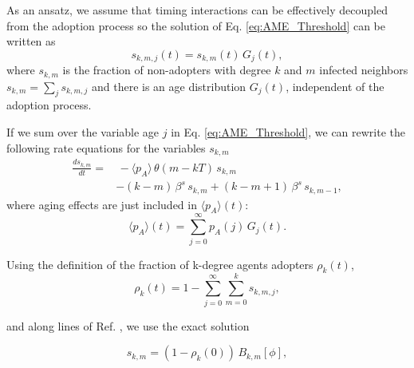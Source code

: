 As an ansatz, we assume that timing interactions can be effectively decoupled from the adoption process so the solution of Eq. \eqref{eq:AME_Threshold} can be written as
\begin{equation}
    \label{eq:assumption1}
    s_{k,m,j}(t) = s_{k,m}(t) \, G_{j} (t),
\end{equation}
where $s_{k,m}$ is the fraction of non-adopters with degree $k$ and $m$ infected neighbors $s_{k,m} = \sum_{j} s_{k,m,j}$ and there is an age distribution $G_{j} (t)$, independent of the adoption process.

If we sum over the variable age $j$ in Eq. \eqref{eq:AME_Threshold}, we can rewrite the following rate equations for the variables $s_{k,m}$
\begin{align}
    \label{eq:threshold_AME_red}
    \frac{d s_{k,m}}{dt}  = & \,  - \langle p_A \rangle \, \theta(m - kT)\, s_{k,m} \\
    & - (k - m) \, \beta^s \,  s_{k,m} + (k - m + 1)\, \beta^s \,  s_{k,m-1}, \nonumber
\end{align}
where aging effects are  just included in $\langle p_A \rangle(t)$: 
\begin{equation}
    \langle p_A \rangle(t) = \sum_{j = 0}^{\infty} p_A(j) \, G_j (t).
\end{equation}

Using the definition of the fraction of k-degree agents adopters $\rho_k (t)$,
\begin{equation}
    \rho_k(t) = 1 - \sum_{j=0}^{\infty} \sum_{m = 0}^k s_{k,m,j},
\end{equation}

and along lines of Ref. \cite{gleeson-2013}, we use the exact solution

\begin{equation}
    s_{k,m} = (1 - \rho_k (0)) \, B_{k,m}[\phi],
\end{equation}


